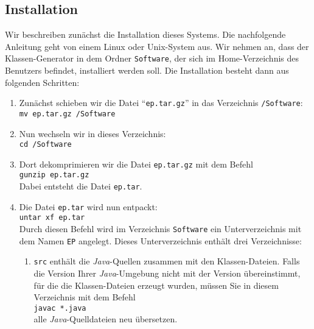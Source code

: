 \subsection{Installation}
Wir beschreiben zun\"achst die Installation dieses Systems.  Die nachfolgende Anleitung geht
von einem Linux oder Unix-System aus.  Wir nehmen an, dass der Klassen-Generator in
dem Ordner \texttt{Software}, der sich im Home-Verzeichnis des Benutzers befindet, installiert
werden soll.  Die Installation besteht dann aus folgenden Schritten:
\begin{enumerate}
\item Zun\"achst schieben wir die Datei ``\texttt{ep.tar.gz}'' 
      in das Verzeichnis \texttt{/Software}: \\[0.2cm]
      \hspace*{1.3cm} \texttt{mv ep.tar.gz /Software}
\item Nun wechseln wir in dieses Verzeichnis: \\[0.2cm]
      \hspace*{1.3cm} \texttt{cd /Software}
\item Dort dekomprimieren wir die Datei \texttt{ep.tar.gz} mit dem Befehl \\[0.2cm]
      \hspace*{1.3cm} \texttt{gunzip ep.tar.gz} \\[0.2cm]
      Dabei entsteht die Datei \texttt{ep.tar}.
\item Die Datei \texttt{ep.tar} wird nun entpackt: \\[0.2cm]
      \hspace*{1.3cm} \texttt{untar xf ep.tar} \\[0.2cm]
      Durch diesen Befehl wird im Verzeichnis \texttt{Software} ein Unterverzeichnis mit dem Namen 
       \texttt{EP} angelegt.  Dieses Unterverzeichnis enth\"alt drei Verzeichnisse:
      \begin{enumerate}
      \item \texttt{src} enth\"alt die \textsl{Java}-Quellen zusammen mit den Klassen-Dateien.
            Falls die Version Ihrer \textsl{Java}-Umgebung nicht mit der Version \"ubereinstimmt,
            f\"ur die die Klassen-Dateien erzeugt wurden, m\"ussen Sie in diesem Verzeichnis mit dem Befehl
            \\[0.2cm]
            \hspace*{1.3cm}
            \texttt{javac *.java}
            \\[0.2cm]
            alle \textsl{Java}-Quelldateien neu \"ubersetzen.

\end{enumerate}
\end{enumerate}
